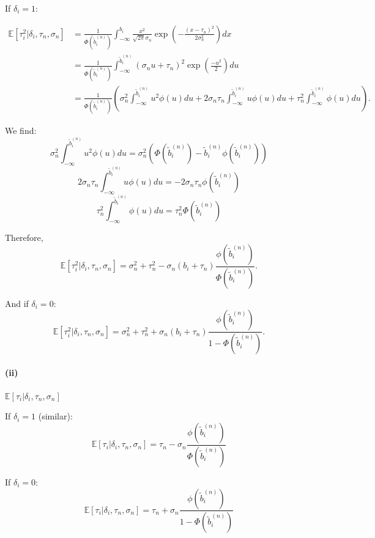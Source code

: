 \documentclass[11pt]{article}
\begin{document}
If $\delta_i = 1$:

\begin{align*}
  \mathbb{E}\left[\tau_i^2 | \delta_i, \tau_n, \sigma_n \right] & = \frac{1}{\Phi\left(\tilde{b}_i^{(n)}\right)} \int_{- \infty}^{b_i}\frac{x^2}{\sqrt{2 \pi}\sigma_n}\exp\left(-\frac{(x-\tau_n)^2}{2 \sigma_n^2}\right) dx \\
  & = \frac{1}{\Phi\left(\tilde{b}_i^{(n)}\right)} \int_{- \infty}^{\tilde{b}_i^{(n)}}(\sigma_n u + \tau_n)^2\exp\left(\frac{-u^2}{2}\right) du \\
  & = \frac{1}{\Phi\left(\tilde{b}_i^{(n)}\right)} \left(\sigma_n^2 \int_{-\infty}^{\tilde{b}_i^{(n)}} u^2 \phi(u)du + 2\sigma_n \tau_n \int_{-\infty}^{\tilde{b}_i^{(n)}} u \phi(u)du + \tau_n^2 \int_{-\infty}^{\tilde{b}_i^{(n)}} \phi(u)du \right).
\end{align*}

We find:
\[
  \sigma_n^2 \int_{-\infty}^{\tilde{b}_i^{(n)}} u^2 \phi(u)du = \sigma_n^2 \left( \Phi\left(\tilde{b}_i^{(n)}\right) - \tilde{b}_i^{(n)} \phi\left(\tilde{b}_i^{(n)}\right)\right)
\]
\[
  2\sigma_n \tau_n \int_{-\infty}^{\tilde{b}_i^{(n)}} u \phi(u)du = - 2 \sigma_n \tau_n \phi\left(\tilde{b}_i^{(n)}\right)
\]
\[
  \tau_n^2 \int_{-\infty}^{\tilde{b}_i^{(n)}} \phi(u)du = \tau_n^2 \Phi\left(\tilde{b}_i^{(n)}\right)
\]

Therefore,
\[
  \mathbb{E}\left[\tau_i^2 | \delta_i, \tau_n, \sigma_n \right] = \sigma_n^2 + \tau_n^2 - \sigma_n (b_i + \tau_n) \frac{\phi\left(\tilde{b}_i^{(n)}\right)}{\Phi\left(\tilde{b}_i^{(n)}\right)}.
\]

And if $\delta_i = 0$:
\[
  \mathbb{E}\left[\tau_i^2 | \delta_i, \tau_n, \sigma_n \right] = \sigma_n^2 + \tau_n^2 + \sigma_n (b_i + \tau_n) \frac{\phi\left(\tilde{b}_i^{(n)}\right)}{1 - \Phi\left(\tilde{b}_i^{(n)}\right)}.
\]

\paragraph*{(ii)} $\mathbb{E}\left[\tau_i| \delta_i, \tau_n, \sigma_n \right]$

If $\delta_i = 1$ (similar):
\[
\mathbb{E}\left[\tau_i| \delta_i, \tau_n, \sigma_n \right] = \tau_n - \sigma_n \frac{\phi\left(\tilde{b}_i^{(n)}\right)}{\Phi\left(\tilde{b}_i^{(n)}\right)}
\]

If $\delta_i = 0$:
\[
\mathbb{E}\left[\tau_i| \delta_i, \tau_n, \sigma_n \right] = \tau_n + \sigma_n \frac{\phi\left(\tilde{b}_i^{(n)}\right)}{1 - \Phi\left(\tilde{b}_i^{(n)}\right)}
\]
\end{document}
